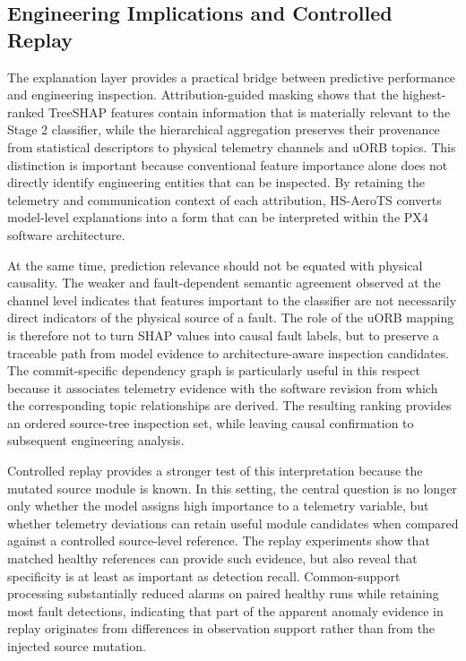 \subsection{Engineering Implications and Controlled Replay}

The explanation layer provides a practical bridge between predictive performance and engineering inspection. Attribution-guided masking shows that the highest-ranked TreeSHAP features contain information that is materially relevant to the Stage 2 classifier, while the hierarchical aggregation preserves their provenance from statistical descriptors to physical telemetry channels and uORB topics. This distinction is important because conventional feature importance alone does not directly identify engineering entities that can be inspected. By retaining the telemetry and communication context of each attribution, HS-AeroTS converts model-level explanations into a form that can be interpreted within the PX4 software architecture.

At the same time, prediction relevance should not be equated with physical causality. The weaker and fault-dependent semantic agreement observed at the channel level indicates that features important to the classifier are not necessarily direct indicators of the physical source of a fault. The role of the uORB mapping is therefore not to turn SHAP values into causal fault labels, but to preserve a traceable path from model evidence to architecture-aware inspection candidates. The commit-specific dependency graph is particularly useful in this respect because it associates telemetry evidence with the software revision from which the corresponding topic relationships are derived. The resulting ranking provides an ordered source-tree inspection set, while leaving causal confirmation to subsequent engineering analysis.

Controlled replay provides a stronger test of this interpretation because the mutated source module is known. In this setting, the central question is no longer only whether the model assigns high importance to a telemetry variable, but whether telemetry deviations can retain useful module candidates when compared against a controlled source-level reference. The replay experiments show that matched healthy references can provide such evidence, but also reveal that specificity is at least as important as detection recall. Common-support processing substantially reduced alarms on paired healthy runs while retaining most fault detections, indicating that part of the apparent anomaly evidence in replay originates from differences in observation support rather than from the injected source mutation.

